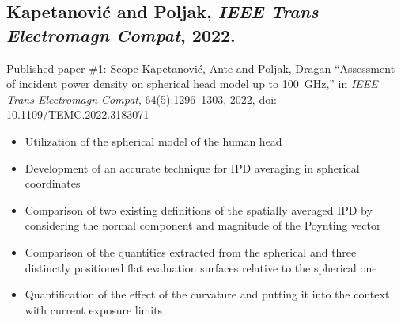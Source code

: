 \documentclass[xcolor=dvipsnames,10pt]{beamer}
\begin{document}
\subsection{Kapetanović and Poljak, \textit{IEEE Trans Electromagn Compat}, 2022.}
\begin{frame}{Published paper \#1: Scope}
    Kapetanović, Ante and Poljak, Dragan ``Assessment of incident power density on spherical head model up to \SI{100}{\GHz},'' in \textit{IEEE Trans Electromagn Compat}, 64(5):1296--1303, 2022, doi: 10.1109/TEMC.2022.3183071
    \begin{itemize}
        \item Utilization of the spherical model of the human head
        \item Development of an accurate technique for IPD averaging in spherical coordinates
        \item Comparison of two existing definitions of the spatially averaged IPD by considering the normal component and magnitude of the Poynting vector
        \item Comparison of the quantities extracted from the spherical and three distinctly positioned flat evaluation surfaces relative to the spherical one
        \item Quantification of the effect of the curvature and putting it into the context with current exposure limits
    \end{itemize}
\end{frame}
\end{document}
